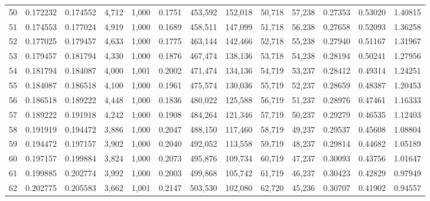 \begin{tabular}{rrrrrrrrrrrrr}
50  &  0.172232 &  0.174552 &   4,712 &  1,000 &                                     0.1751 &  453,592 &  152,018 &   50,718 &   57,238 &  0.27353 &  0.53020 &  1.40815 \\
51  &  0.174553 &  0.177024 &   4,919 &  1,000 &                                     0.1689 &  458,511 &  147,099 &   51,718 &   56,238 &  0.27658 &  0.52093 &  1.36258 \\
52  &  0.177025 &  0.179457 &   4,633 &  1,000 &                                     0.1775 &  463,144 &  142,466 &   52,718 &   55,238 &  0.27940 &  0.51167 &  1.31967 \\
53  &  0.179457 &  0.181794 &   4,330 &  1,000 &                                     0.1876 &  467,474 &  138,136 &   53,718 &   54,238 &  0.28194 &  0.50241 &  1.27956 \\
54  &  0.181794 &  0.184087 &   4,000 &  1,001 &                                     0.2002 &  471,474 &  134,136 &   54,719 &   53,237 &  0.28412 &  0.49314 &  1.24251 \\
55  &  0.184087 &  0.186518 &   4,100 &  1,000 &                                     0.1961 &  475,574 &  130,036 &   55,719 &   52,237 &  0.28659 &  0.48387 &  1.20453 \\
56  &  0.186518 &  0.189222 &   4,448 &  1,000 &                                     0.1836 &  480,022 &  125,588 &   56,719 &   51,237 &  0.28976 &  0.47461 &  1.16333 \\
57  &  0.189222 &  0.191918 &   4,242 &  1,000 &                                     0.1908 &  484,264 &  121,346 &   57,719 &   50,237 &  0.29279 &  0.46535 &  1.12403 \\
58  &  0.191919 &  0.194472 &   3,886 &  1,000 &                                     0.2047 &  488,150 &  117,460 &   58,719 &   49,237 &  0.29537 &  0.45608 &  1.08804 \\
59  &  0.194472 &  0.197157 &   3,902 &  1,000 &                                     0.2040 &  492,052 &  113,558 &   59,719 &   48,237 &  0.29814 &  0.44682 &  1.05189 \\
60  &  0.197157 &  0.199884 &   3,824 &  1,000 &                                     0.2073 &  495,876 &  109,734 &   60,719 &   47,237 &  0.30093 &  0.43756 &  1.01647 \\
61  &  0.199885 &  0.202774 &   3,992 &  1,000 &                                     0.2003 &  499,868 &  105,742 &   61,719 &   46,237 &  0.30423 &  0.42829 &  0.97949 \\
62  &  0.202775 &  0.205583 &   3,662 &  1,001 &                                     0.2147 &  503,530 &  102,080 &   62,720 &   45,236 &  0.30707 &  0.41902 &  0.94557 \\

\end{tabular}
